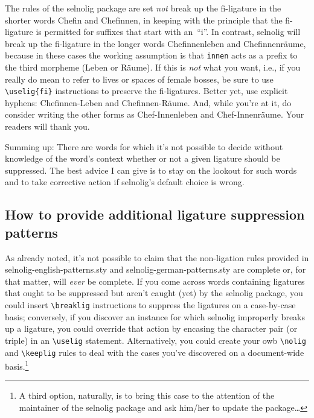 \documentclass[11pt]{article}
\newcommand{\pkg}[1]{\textsf{#1}}
\newcommand{\opt}[1]{\texttt{#1}}
\newcommand{\cmmd}[1]{\texttt{\textbackslash #1}}
\begin{document}
The rules of the \pkg{selnolig} package are set \emph{not} break up the fi-ligature in the shorter words Chefin and Chefinnen, in keeping with the principle that the fi-ligature is permitted for suffixes that start with an~\enquote{i}. In contrast, \pkg{selnolig} will break up the fi-ligature in the longer words Chefinnenleben and Chefinnenräume, because in these cases the working assumption is that \opt{innen} acts as a prefix to the third morpheme (Leben or Räume). If this is \emph{not} what you want, i.e., if you really do mean to refer to lives or spaces of female bosses, be sure to use \Verb+\uselig{fi}+ instructions to preserve the fi-ligatures. Better yet, use explicit hyphens: Chefinnen-Leben and Chefinnen-Räume. And, while you're at it, do consider writing the other forms as Chef-Innenleben and Chef-Innenräume. Your readers will thank you.

Summing up: There are words for which it's not possible to decide without knowledge of the word's context whether or not a given ligature should be suppressed. The best advice I can give is to stay on the lookout for such words and to take corrective action if \pkg{selnolig}'s default choice is wrong.



\subsection{How to provide additional ligature suppression patterns}

As already noted, it's not possible to claim that the non-ligation rules provided in \pkg{selnolig-english-patterns.sty} and \pkg{selnolig-german-patterns.sty} are complete or, for that matter, will \emph{ever} be complete. If you come across words containing ligatures that ought to be suppressed but aren't caught (yet) by the \pkg{selnolig} package, you could insert \cmmd{breaklig} instructions to suppress the ligatures on a case-by-case basis; conversely, if you discover an instance for which \pkg{selnolig} improperly breaks up a ligature, you could override that action by encasing the character pair (or triple) in an \cmmd{uselig} statement. Alternatively, you could create your owb \cmmd{nolig} and \cmmd{keeplig} rules to deal with the cases you've discovered on a document-wide basis.\footnote{A third option, naturally, is to bring this case to the attention of the maintainer of the \pkg{selnolig} package and ask him/her to update the package\dots}
\end{document}
